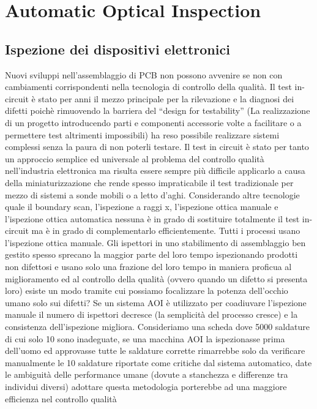 \chapter{Automatic Optical Inspection}

\section{Ispezione dei dispositivi elettronici}
Nuovi sviluppi nell’assemblaggio di PCB non possono avvenire se non con cambiamenti corrispondenti
nella tecnologia di controllo della qualità.
Il test in-circuit è stato per anni il mezzo principale per la rilevazione e la diagnosi dei difetti poichè
rimuovendo la barriera del “design for testability” (La realizzazione di un progetto introducendo parti e
componenti accessorie volte a facilitare o a permettere test altrimenti impossibili) ha reso possibile
realizzare sistemi complessi senza la paura di non poterli testare. Il test in circuit è stato per tanto un
approccio semplice ed universale al problema del controllo qualità nell’industria elettronica ma risulta
essere sempre più difficile applicarlo a causa della miniaturizzazione che rende spesso impraticabile il test
tradizionale per mezzo di sistemi a sonde mobili o a letto d’aghi.
Considerando altre tecnologie quale il boundary scan, l’ispezione a raggi x, l’ispezione ottica manuale e
l’ispezione ottica automatica nessuna è in grado di sostituire totalmente il test in-circuit ma è in grado di
complementarlo efficientemente.
Tutti i processi usano l’ispezione ottica manuale. Gli ispettori in uno stabilimento di assemblaggio ben
gestito spesso sprecano la maggior parte del loro tempo ispezionando prodotti non difettosi e usano solo
una frazione del loro tempo in maniera proficua al miglioramento ed al controllo della qualità (ovvero
quando un difetto si presenta loro) esiste un modo tramite cui possiamo focalizzare la potenza dell’occhio
umano solo sui difetti?
Se un sistema AOI è utilizzato per coadiuvare l’ispezione manuale il numero di ispettori decresce (la
semplicità del processo cresce) e la consistenza dell’ispezione migliora. Consideriamo una scheda dove
5000 saldature di cui solo 10 sono inadeguate, se una macchina AOI la ispezionasse prima dell’uomo ed
approvasse tutte le saldature corrette rimarrebbe solo da verificare manualmente le 10 saldature riportate
come critiche dal sistema automatico, date le ambiguità delle performance umane (dovute a stanchezza e
differenze tra individui diversi) adottare questa metodologia porterebbe ad una maggiore efficienza nel controllo qualità

